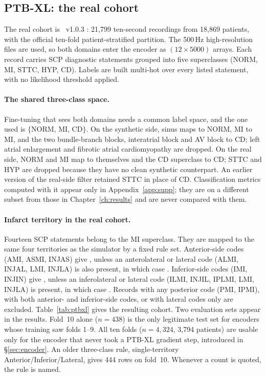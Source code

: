 \subsection{PTB-XL: the real cohort}
\label{sec:data-ptbxl}

The real cohort is \ptbxl\ v1.0.3 \citep{wagner2020ptbxl,strodthoff2021deep}: 21,799 ten-second recordings from 18,869 patients, with the official ten-fold patient-stratified partition. The 500\,Hz high-resolution files are used, so both domains enter the encoder as $(12 \times 5000)$ arrays. Each record carries SCP diagnostic statements grouped into five superclasses (NORM, MI, STTC, HYP, CD). Labels are built multi-hot over every listed statement, with no likelihood threshold applied. 

\paragraph{The shared three-class space.}
Fine-tuning that sees both domains needs a common label space, and the one used is $\{$NORM, MI, CD$\}$. On the synthetic side, sinus maps to NORM, MI to MI, and the two bundle-branch blocks, interatrial block and AV block to CD; left atrial enlargement and fibrotic atrial cardiomyopathy are dropped. On the real side, NORM and MI map to themselves and the CD superclass to CD; STTC and HYP are dropped because they have no clean synthetic counterpart.  An earlier version of the real-side filter retained STTC in place of CD. Classification metrics computed with it appear only in Appendix~\ref{app:supp}; they are on a different subset from those in Chapter~\ref{ch:results} and are never compared with them. 

\paragraph{Infarct territory in the real cohort.}
Fourteen SCP statements belong to the MI superclass. They are mapped to the same four territories as the simulator by a fixed rule set. Anterior-side codes (AMI, ASMI, INJAS) give \AS, unless an anterolateral or lateral code (ALMI, INJAL, LMI, INJLA) is also present, in which case \AL. Inferior-side codes (IMI, INJIN) give \INF, unless an inferolateral or lateral code (ILMI, INJIL, IPLMI, LMI, INJLA) is present, in which case \IL. Records with any posterior code (PMI, IPMI), with both anterior- and inferior-side codes, or with lateral codes only are excluded.  Table~\ref{tab:ptbxl} gives the resulting cohort. Two evaluation sets appear in the results. Fold~10 alone ($n=438$) is the only legitimate test set for encoders whose training saw folds 1--9. All ten folds ($n=4{,}324$, 3,794 patients) are usable only for the encoder that never took a PTB-XL gradient step, introduced in \S\ref{sec:encoder}. An older three-class rule, single-territory Anterior/Inferior/Lateral, gives 444 rows on fold~10. Whenever a count is quoted, the rule is named. 


